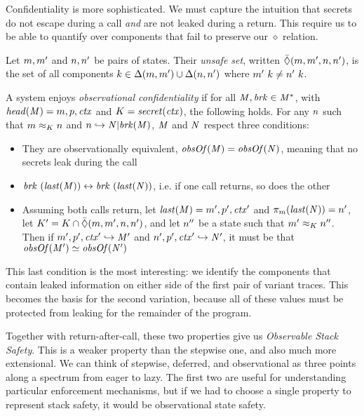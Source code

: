\documentclass[acmsmall,review,anonymous]{acmart}\settopmatter{printfolios=true,printccs=false,printacmref=false}
\begin{document}
{\medskip

Confidentiality is more sophisticated. We must capture the intuition that
secrets do not escape during a call {\em and} are not leaked during a return.
This require us to be able to quantify over components that fail to preserve
our \(\diamond\) relation.

 Let \(m,m'\) and \(n,n'\)
be pairs of states. Their {\em unsafe set}, written
\(\bar{\Diamond}(m,m',n,n')\), is the set of all components
\(k \in \Delta(m,m') \cup \Delta(n,n')\) where
\(m' ~ k \not = n' ~ k\).

A system enjoys {\em observational confidentiality} if for all
\(\mathit{M},\mathit{brk} \in \mathit{M}^*\), with \(\mathit{head}(\mathit{M}) = m,p,\mathit{ctx}\) and
\(K = \mathit{secret}(\mathit{ctx})\), the following holds.
%
For any \(n\) such that \(m \approx_K n\) and
\(n \hookrightarrow \mathit{N} | \mathit{brk}(\mathit{M})\),
\(\mathit{M}\) and \(\mathit{N}\) respect three conditions:

\begin{itemize}
\item They are observationally equivalent, \(\mathit{obsOf}(\mathit{M}) = \mathit{obsOf}(\mathit{N})\),
  meaning that no secrets leak during the call
\item \(\mathit{brk} ~ (\mathit{last}(\mathit{M})) \leftrightarrow \mathit{brk} ~
(\mathit{last}(\mathit{N}))\), i.e. if one call returns, so does the other
\item Assuming both calls return, let \(\mathit{last}(\mathit{M}) = m',p',\mathit{ctx}'\)
  and \(\pi_m(\mathit{last}(\mathit{N})) = n'\),
  let \(K' = K \cap \bar{\Diamond}(m,m',n,n')\),
  and let \(n''\) be a state such that \(m' \approx_K n''\).
  Then if \(m',p',\mathit{ctx}' \hookrightarrow \mathit{M}'\) and
  \(n',p',\mathit{ctx}' \hookrightarrow \mathit{N}'\), it must be
  that \(\mathit{obsOf}(\mathit{M}') \simeq \mathit{obsOf}(\mathit{N}')\)
\end{itemize}

This last condition is the most interesting: we identify the components that
contain leaked information on either side of the first pair of variant traces.
This becomes the basis for the second variation, because all of these values
must be protected from leaking for the remainder of the program.

Together with return-after-call, these two properties give us
{\em Observable Stack Safety}. This is a weaker property
than the stepwise one, and also much more extensional.
We can think of stepwise, deferred, and observational as
three points along a spectrum from eager to lazy. The first two
are useful for understanding particular enforcement mechanisms,
but if we had to choose a single property to represent stack safety,
it would be observational state safety.

}
\end{document}
